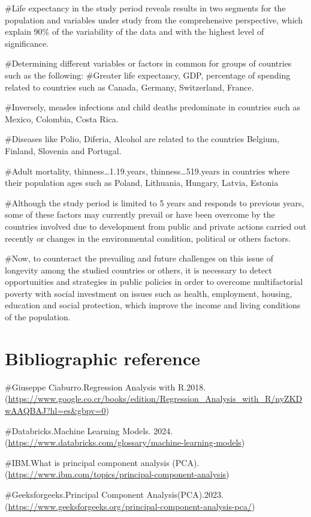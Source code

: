 \documentclass[
]{article}
\begin{document}
\#Life expectancy in the study period reveals results in two segments
for the population and variables under study from the comprehensive
perspective, which explain 90\% of the variability of the data and with
the highest level of significance.

\#Determining different variables or factors in common for groups of
countries such as the following: \#Greater life expectancy, GDP,
percentage of spending related to countries such as Canada, Germany,
Switzerland, France.

\#Inversely, measles infections and child deaths predominate in
countries such as Mexico, Colombia, Costa Rica.

\#Diseases like Polio, Diferia, Alcohol are related to the countries
Belgium, Finland, Slovenia and Portugal.

\#Adult mortality, thinness\ldots1.19.years, thinness\ldots519.years in
countries where their population ages such as Poland, Lithuania,
Hungary, Latvia, Estonia

\#Although the study period is limited to 5 years and responds to
previous years, some of these factors may currently prevail or have been
overcome by the countries involved due to development from public and
private actions carried out recently or changes in the environmental
condition, political or others factors.

\#Now, to counteract the prevailing and future challenges on this issue
of longevity among the studied countries or others, it is necessary to
detect opportunities and strategies in public policies in order to
overcome multifactorial poverty with social investment on issues such as
health, employment, housing, education and social protection, which
improve the income and living conditions of the population.

\section{Bibliographic reference}\label{bibliographic-reference}

\#Giuseppe Ciaburro.Regression Analysis with
R.2018.(\url{https://www.google.co.cr/books/edition/Regression_Analysis_with_R/nyZKDwAAQBAJ?hl=es&gbpv=0})

\#Databricks.Machine Learning Models.
2024.(\url{https://www.databricks.com/glossary/machine-learning-models})

\#IBM.What is principal component analysis
(PCA).(\url{https://www.ibm.com/topics/principal-component-analysis})

\#Geeksforgeeks.Principal Component
Analysis(PCA).2023.(\url{https://www.geeksforgeeks.org/principal-component-analysis-pca/})
\end{document}
